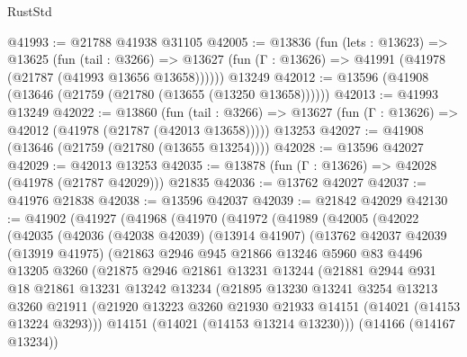\begin{lexlean}{RustStd}
\begin{coremodule}
@41993 := @21788 @41938 @31105
@42005 := @13836
    (fun (lets : @13623) =>
    @13625
      (fun (tail : @3266) =>
      @13627 (fun (Γ : @13626) => @41991 (@41978 (@21787 (@41993 @13656 @13658))))))
    @13249
@42012 := @13596 (@41908 (@13646 (@21759 (@21780 (@13655 (@13250 @13658))))))
@42013 := @41993 @13249
@42022 := @13860
    (fun (tail : @3266) => @13627 (fun (Γ : @13626) => @42012 (@41978 (@21787 (@42013 @13658)))))
    @13253
@42027 := @41908 (@13646 (@21759 (@21780 (@13655 @13254))))
@42028 := @13596 @42027
@42029 := @42013 @13253
@42035 := @13878 (fun (Γ : @13626) => @42028 (@41978 (@21787 @42029))) @21835
@42036 := @13762 @42027
@42037 := @41976 @21838
@42038 := @13596 @42037
@42039 := @21842 @42029
@42130 := @41902
    (@41927
      (@41968
        (@41970
          (@41972
            (@41989
              (@42005
                (@42022
                  (@42035
                    (@42036
                      (@42038 @42039)
                      (@13914 @41907)
                      (@13762
                        @42037
                        @42039
                        (@13919 @41975)
                        (@21863
                          @2946
                          @945
                          @21866
                          @13246
                          @5960
                          @83
                          @4496
                          @13205
                          @3260
                          (@21875
                            @2946
                            @21861
                            @13231
                            @13244
                            (@21881
                              @2944
                              @931
                              @18
                              @21861
                              @13231
                              @13242
                              @13234
                              (@21895
                                @13230
                                @13241
                                @3254
                                @13213
                                @3260
                                @21911
                                (@21920
                                  @13223
                                  @3260
                                  @21930
                                  @21933
                                  @14151
                                  (@14021 (@14153 @13224 @3293)))
                                @14151
                                (@14021 (@14153 @13214 @13230)))
                              (@14166 (@14167 @13234))

\end{coremodule}
\end{lexlean}
